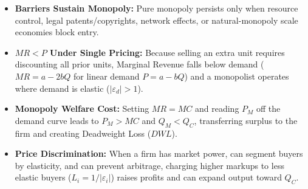 \documentclass[11pt,letterpaper]{article}
\begin{document}
\begin{takeaways}
\begin{itemize}
    \item \textbf{Barriers Sustain Monopoly:} Pure monopoly persists only when resource control, legal patents/copyrights, network effects, or natural-monopoly scale economies block entry.
    \item \textbf{$MR < P$ Under Single Pricing:} Because selling an extra unit requires discounting all prior units, Marginal Revenue falls below demand ($MR = a - 2bQ$ for linear demand $P = a - bQ$) and a monopolist operates where demand is elastic ($|\varepsilon_d| > 1$).
    \item \textbf{Monopoly Welfare Cost:} Setting $MR = MC$ and reading $P_M$ off the demand curve leads to $P_M > MC$ and $Q_M < Q_C$, transferring surplus to the firm and creating Deadweight Loss ($DWL$).
    \item \textbf{Price Discrimination:} When a firm has market power, can segment buyers by elasticity, and can prevent arbitrage, charging higher markups to less elastic buyers ($L_i = 1/|\varepsilon_i|$) raises profits and can expand output toward $Q_C$.
\end{itemize}
\end{takeaways}
\end{document}
